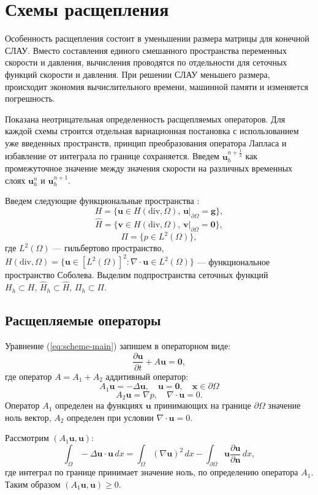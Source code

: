 \documentclass[12pt]{article}
\begin{document}
\section{Схемы расщепления}
Особенность расщепления состоит в уменьшении размера матрицы для конечной СЛАУ. Вместо составления единого смешанного пространства переменных скорости и давления, вычисления проводятся по отдельности для сеточных функций скорости и давления. При решении СЛАУ меньшего размера, происходит экономия вычислительного времени, машинной памяти и изменяется погрешность.

Показана неотрицательная определенность расщепляемых операторов.
Для каждой схемы строится отдельная вариационная постановка с использованием уже введенных пространств, принцип преобразования оператора Лапласа и избавление от интеграла по границе сохраняется. Введем ${\bm u}_h^{n+\frac{1}{2}}$ как промежуточное значение между значения скорости на различных временных слоях ${\bm u}_h^n$ и ${\bm u}_h^{n+1}$.

Введем следующие функциональные пространства \cite{guzman-2011}:
$$
H=\{ {\bm u} \in H(\mathrm{div}, \Omega), \, {\bm u}|_{\partial \Omega}= {\bm g} \},
$$
$$
\hat{H}=\{ {\bm v} \in H(\mathrm{div}, \Omega), \, {\bm v}|_{\partial \Omega}={\bm 0} \},
$$
$$
\Pi=\{ p \in L^2(\Omega) \},
$$
где $L^2(\Omega)$ --- гильбертово пространство, $H(\mathrm{div}, \Omega) = \{{\bm u} \in [L^2(\Omega)]^2 : \nabla\cdot {\bm u} \in L^2(\Omega)\}$ --- функциональное пространство Соболева. Выделим подпространства сеточных функций $H_h \subset H, \, \hat{H}_h \subset \hat{H}, \, \Pi_h \subset \Pi$.

\subsection{Расщепляемые операторы}
Уравнение (\ref{eq:scheme-main}) запишем в операторном виде:
$$
\frac{\partial {\bm u}}{\partial t} + A {\bm u} = {\bm 0},
$$
где оператор $A=A_1 + A_2$ аддитивный оператор:
$$A_1 {\bm u} = - \Delta {\bm u}, \quad {\bm u} = {\bm 0}, \quad {\bm x} \in {\partial \Omega}$$
$$A_2 {\bm u} = \nabla p, \quad \nabla \cdot {\bm u} = 0.$$
Оператор $A_1$ определен на функциях ${\bm u}$ принимающих на границе $\partial \Omega$ значение ноль вектор, $A_2$ определен при условии $\nabla \cdot {\bm u} = 0.$

Рассмотрим $(A_1 {\bm u}, {\bm u})$:
$$
\int_{\Omega} -\Delta {\bm u} \cdot {\bm u} \, dx = \int_{\Omega} (\nabla {\bm u})^2 \, dx - \int_{\partial \Omega} {\bm u} \frac{\partial {\bm u}}{\partial {\bm n}} \, dx,
$$
где интеграл по границе принимает значение ноль, по определению оператора $A_1$. Таким образом $(A_1 {\bm u}, {\bm u}) \geq 0$.
\end{document}
